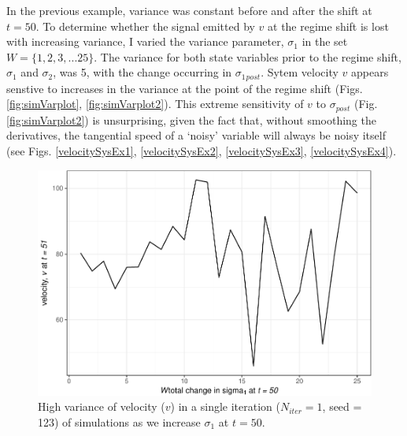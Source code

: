 \documentclass[12pt,twoside,openany]{reedthesis}
\begin{document}
In the previous example, variance was constant before and after the
shift at \(t=50\). To determine whether the signal emitted by \(v\) at
the regime shift is lost with increasing variance, I varied the variance
parameter, \(\sigma_1\) in the set \(W = \{1,2,3,...25 \}\). The
variance for both state variables prior to the regime shift,
\(\sigma_1\) and \(\sigma_2\), was 5, with the change occurring in
\(\sigma_1{_{post}}\). Sytem velocity \(v\) appears senstive to
increases in the variance at the point of the regime shift (Figs.
\ref{fig:simVarplot}, \ref{fig:simVarplot2}). This extreme sensitivity
of \(v\) to \(\sigma{_{post}}\) (Fig. \ref{fig:simVarplot2}) is
unsurprising, given the fact that, without smoothing the derivatives,
the tangential speed of a `noisy' variable will always be noisy itself
(see Figs. \ref{velocitySysEx1}, \ref{velocitySysEx2},
\ref{velocitySysEx3}, \ref{velocitySysEx4}).
\begin{figure}
\centering
\includegraphics{_myDissertation_files/figure-latex/simVarPlot-1.pdf}
\caption{\label{fig:simVarPlot}High variance of velocity (\(v\)) in a single
iteration (\(N_{iter}=1\), seed = 123) of simulations as we increase
\(\sigma_1\) at \(t=50\).}
\end{figure}
\end{document}
